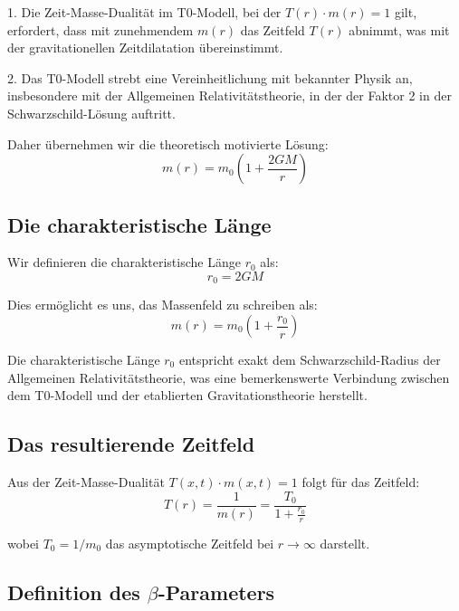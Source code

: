 \documentclass[12pt,a4paper]{article}
\begin{document}
1. Die Zeit-Masse-Dualität im T0-Modell, bei der $T(r) \cdot m(r) = 1$ gilt, erfordert, dass mit zunehmendem $m(r)$ das Zeitfeld $T(r)$ abnimmt, was mit der gravitationellen Zeitdilatation übereinstimmt.

2. Das T0-Modell strebt eine Vereinheitlichung mit bekannter Physik an, insbesondere mit der Allgemeinen Relativitätstheorie, in der der Faktor 2 in der Schwarzschild-Lösung auftritt.

Daher übernehmen wir die theoretisch motivierte Lösung:
\begin{equation}
	\boxed{m(r) = m_0\left(1 + \frac{2GM}{r}\right)}
\end{equation}

\subsection{Die charakteristische Länge}
\label{subsec:characteristic_length_definition}

Wir definieren die charakteristische Länge $r_0$ als:
\begin{equation}
	\boxed{r_0 = 2GM}
\end{equation}

Dies ermöglicht es uns, das Massenfeld zu schreiben als:
\begin{equation}
	m(r) = m_0\left(1 + \frac{r_0}{r}\right)
\end{equation}

Die charakteristische Länge $r_0$ entspricht exakt dem Schwarzschild-Radius der Allgemeinen Relativitätstheorie, was eine bemerkenswerte Verbindung zwischen dem T0-Modell und der etablierten Gravitationstheorie herstellt.

\subsection{Das resultierende Zeitfeld}
\label{subsec:resulting_time_field}

Aus der Zeit-Masse-Dualität $T(x,t) \cdot m(x,t) = 1$ folgt für das Zeitfeld:
\begin{equation}
	T(r) = \frac{1}{m(r)} = \frac{T_0}{1 + \frac{r_0}{r}}
\end{equation}

wobei $T_0 = 1/m_0$ das asymptotische Zeitfeld bei $r \to \infty$ darstellt.

\subsection{Definition des $\beta$-Parameters}
\label{subsec:beta_definition}
\end{document}
